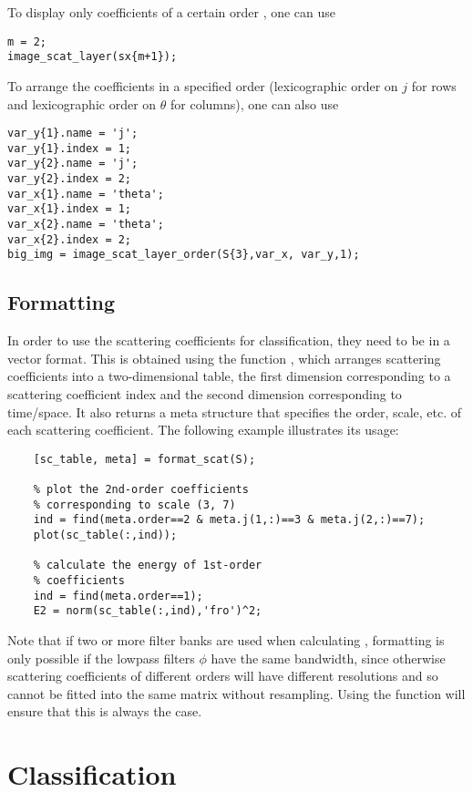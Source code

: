 \documentclass[twocolumn]{article}
\begin{document}
To display only coefficients of a certain order , one can use 
\begin{lstlisting}
m = 2;
image_scat_layer(sx{m+1});
\end{lstlisting}

To arrange the coefficients in a specified order (lexicographic order on $j$ for rows and lexicographic order on $\theta$ for columns), one can also use 
\begin{lstlisting}
var_y{1}.name = 'j';
var_y{1}.index = 1;
var_y{2}.name = 'j';
var_y{2}.index = 2;
var_x{1}.name = 'theta';
var_x{1}.index = 1;
var_x{2}.name = 'theta';
var_x{2}.index = 2;
big_img = image_scat_layer_order(S{3},var_x, var_y,1);
\end{lstlisting}

\subsection{Formatting}
In order to use the scattering coefficients for classification, they need to
be in a vector format. This is obtained using the function
, which arranges scattering coefficients into a
two-dimensional table, the first dimension corresponding to a scattering
coefficient index and the second dimension corresponding to time/space. It
also returns a meta structure that specifies the order, scale, etc. of each
scattering coefficient. The following example illustrates its usage:

\begin{lstlisting}
	[sc_table, meta] = format_scat(S);
	
	% plot the 2nd-order coefficients
	% corresponding to scale (3, 7)
	ind = find(meta.order==2 & meta.j(1,:)==3 & meta.j(2,:)==7);
	plot(sc_table(:,ind));
	
	% calculate the energy of 1st-order
	% coefficients
	ind = find(meta.order==1);
	E2 = norm(sc_table(:,ind),'fro')^2;
\end{lstlisting}

Note that if two or more filter banks are used when calculating , formatting is only possible if the lowpass filters $\phi$ have the same bandwidth, since otherwise scattering coefficients of different orders will have different resolutions and so cannot be fitted into the same matrix without resampling. Using the  function will ensure that this is always the case.

\section{Classification}
\end{document}
